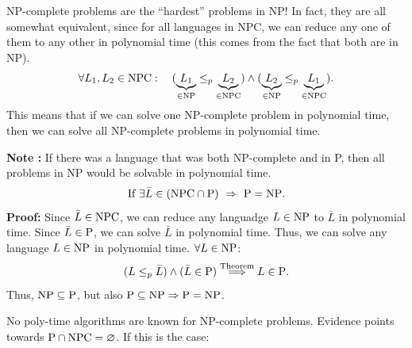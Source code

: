 NP-complete problems are the ``hardest'' problems in NP! In fact, they are all somewhat equivalent, since for all languages in NPC, we can reduce any one of them to any other in polynomial time (this comes from the fact that both are in NP).
\[
\forall L_1,L_2\in\mathrm{NPC}:\quad
(\underbrace{L_1}_{\in\mathrm{NP}}\leq_p\underbrace{L_2}_{\in\mathrm{NPC}})\land
(\underbrace{L_2}_{\in\mathrm{NP}}\leq_p\underbrace{L_1}_{\in\mathrm{NPC}}).
\]
This means that if we can solve one NP-complete problem in polynomial time, then we can solve all NP-complete problems in polynomial time.

\textbf{Note :}
If there was a language that was both NP-complete and in P, then all problems in NP would be solvable in polynomial time.
\[
\text{If }\exists\bar L\in(\mathrm{NPC}\cap\mathrm{P})\ \Rightarrow\ \mathrm{P}=\mathrm{NP}.
\]
\textbf{Proof:} 
Since $\bar L\in\mathrm{NPC}$, we can reduce any languadge $L\in\mathrm{NP}$ to $\bar L$ in polynomial time. Since $\bar L\in\mathrm{P}$, we can solve $\bar L$ in polynomial time. Thus, we can solve any language $L\in\mathrm{NP}$ in polynomial time.
$\forall L\in\mathrm{NP}$:
\[
(L\leq_p\bar L)\land(\bar L\in\mathrm{P})\overset{\text{Theorem}}{\Longrightarrow}L\in\mathrm{P}.
\]
Thus, $\mathrm{NP}\subseteq\mathrm{P}$, but also $\mathrm{P}\subseteq\mathrm{NP}\Rightarrow\mathrm{P}=\mathrm{NP}$.

No poly-time algorithms are known for NP-complete problems. Evidence points towards $\mathrm{P}\cap\mathrm{NPC}=\varnothing$.
If this is the case:
